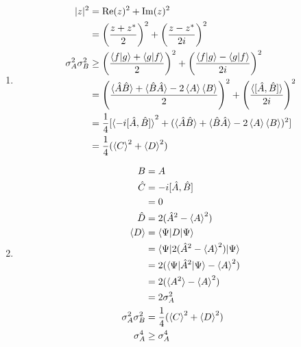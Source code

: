 \documentclass{article}
\renewcommand{\Im}{\operatorname{Im}}
\renewcommand{\Re}{\operatorname{Re}}
\begin{document}
\begin{enumerate}
  \item

        \begin{align*}
          |z|^2                 & = \Re(z)^2 + \Im(z)^2                                                                                                                                                 \\
                                & = \left( \frac{z + z^*}{2} \right)^2 + \left( \frac{z - z^*}{2 i} \right)^2                                                                                           \\
          \sigma_A^2 \sigma_B^2 & \ge \left( \frac{\braket{f | g} + \braket{g | f}}{2} \right)^2 + \left( \frac{\braket{f | g} - \braket{g | f}}{2 i} \right)^2                                         \\
                                & = \left( \frac{\braket{\hat{A} \hat{B}} + \braket{\hat{B} \hat{A}} - 2 \braket{A} \braket{B}}{2} \right)^2 + \left( \frac{\braket{[\hat{A}, \hat{B}]}}{2 i} \right)^2 \\
                                & = \frac{1}{4} [\braket{-i [\hat{A}, \hat{B}]}^2 + (\braket{\hat{A} \hat{B}} + \braket{\hat{B} \hat{A}} - 2 \braket{A} \braket{B})^2]                                  \\
                                & = \frac{1}{4} (\braket{C}^2 + \braket{D}^2)
        \end{align*}

  \item

        \begin{align*}
          B                     & = A                                                   \\
          \hat{C}               & = -i [\hat{A}, \hat{B}]                               \\
                                & = 0                                                   \\
          \hat{D}               & = 2 (\hat{A}^2 - \braket{A}^2)                        \\
          \braket{D}            & = \braket{\Psi | D | \Psi}                            \\
                                & = \braket{\Psi | 2 (\hat{A}^2 - \braket{A}^2) | \Psi} \\
                                & = 2 (\braket{\Psi | \hat{A}^2 | \Psi} - \braket{A}^2) \\
                                & = 2 (\braket{A^2} - \braket{A}^2)                     \\
                                & = 2 \sigma_A^2                                        \\
          \sigma_A^2 \sigma_B^2 & = \frac{1}{4} (\braket{C}^2 + \braket{D}^2)           \\
          \sigma_A^4            & \ge \sigma_A^4
        \end{align*}
\end{enumerate}
\end{document}
